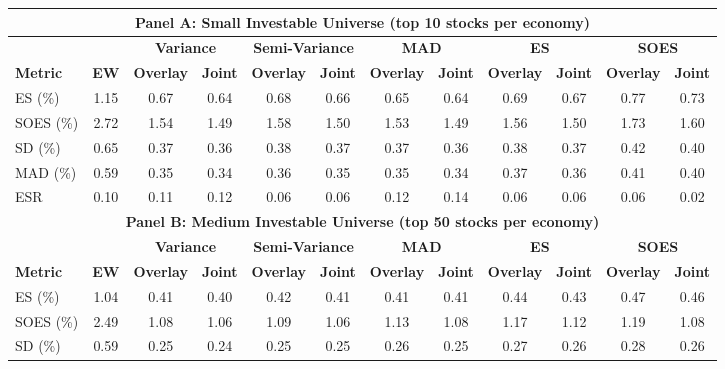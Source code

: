   \begin{tabular}{l*{11}{c}}
    \toprule
    \multicolumn{12}{c}{\textbf{Panel A: Small Investable Universe (top 10 stocks per economy)}} \\
    \midrule
    & & \multicolumn{2}{c}{\textbf{Variance}} & \multicolumn{2}{c}{\textbf{Semi-Variance}} & \multicolumn{2}{c}{\textbf{MAD}} & \multicolumn{2}{c}{\textbf{ES}} & \multicolumn{2}{c}{\textbf{SOES}} \\
    \cmidrule(lr){3-4} \cmidrule(lr){5-6} \cmidrule(lr){7-8} \cmidrule(lr){9-10} \cmidrule(lr){11-12}
    \textbf{Metric} & \textbf{EW} & \textbf{Overlay} & \textbf{Joint} & \textbf{Overlay} & \textbf{Joint} & \textbf{Overlay} & \textbf{Joint} & \textbf{Overlay} & \textbf{Joint} & \textbf{Overlay} & \textbf{Joint} \\
    \midrule
    ES (\%) & 1.15 & 0.67 & 0.64 & 0.68 & 0.66 & 0.65 & 0.64 & 0.69 & 0.67 & 0.77 & 0.73 \\
    SOES (\%) & 2.72 & 1.54 & 1.49 & 1.58 & 1.50 & 1.53 & 1.49 & 1.56 & 1.50 & 1.73 & 1.60 \\
    SD (\%) & 0.65 & 0.37 & 0.36 & 0.38 & 0.37 & 0.37 & 0.36 & 0.38 & 0.37 & 0.42 & 0.40 \\
    MAD (\%) & 0.59 & 0.35 & 0.34 & 0.36 & 0.35 & 0.35 & 0.34 & 0.37 & 0.36 & 0.41 & 0.40 \\
    ESR & 0.10 & 0.11 & 0.12 & 0.06 & 0.06 & 0.12 & 0.14 & 0.06 & 0.06 & 0.06 & 0.02 \\
    \midrule
    \multicolumn{12}{c}{\textbf{Panel B: Medium Investable Universe (top 50 stocks per economy)}} \\
    \midrule
    & & \multicolumn{2}{c}{\textbf{Variance}} & \multicolumn{2}{c}{\textbf{Semi-Variance}} & \multicolumn{2}{c}{\textbf{MAD}} & \multicolumn{2}{c}{\textbf{ES}} & \multicolumn{2}{c}{\textbf{SOES}} \\
    \cmidrule(lr){3-4} \cmidrule(lr){5-6} \cmidrule(lr){7-8} \cmidrule(lr){9-10} \cmidrule(lr){11-12}
    \textbf{Metric} & \textbf{EW} & \textbf{Overlay} & \textbf{Joint} & \textbf{Overlay} & \textbf{Joint} & \textbf{Overlay} & \textbf{Joint} & \textbf{Overlay} & \textbf{Joint} & \textbf{Overlay} & \textbf{Joint} \\
    \midrule
    ES (\%) & 1.04 & 0.41 & 0.40 & 0.42 & 0.41 & 0.41 & 0.41 & 0.44 & 0.43 & 0.47 & 0.46 \\
    SOES (\%) & 2.49 & 1.08 & 1.06 & 1.09 & 1.06 & 1.13 & 1.08 & 1.17 & 1.12 & 1.19 & 1.08 \\
    SD (\%) & 0.59 & 0.25 & 0.24 & 0.25 & 0.25 & 0.26 & 0.25 & 0.27 & 0.26 & 0.28 & 0.26 \\

\end{tabular}
